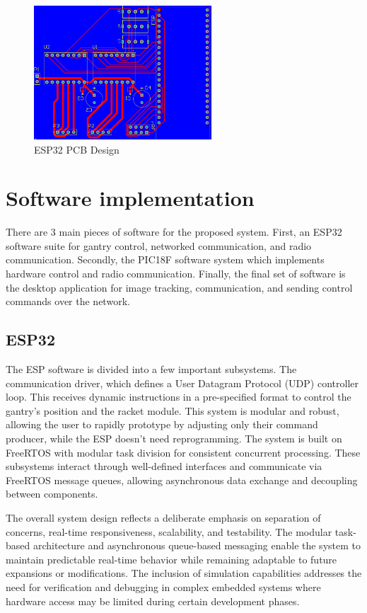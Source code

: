 \begin{figure}[h]
	\centering\includegraphics[height=5cm]{./images/ESP32_pcb}
	\caption{ESP32 PCB Design}
	\label{fig:esp-pcb}
\end{figure}


\section{Software implementation}

There are 3 main pieces of software for the proposed system. First, an ESP32 software suite for gantry control, networked communication, and radio communication. Secondly, the PIC18F software system which implements hardware control and radio communication. Finally, the final set of software is the desktop application for image tracking, communication, and sending control commands over the network.

\subsection{ESP32}
The ESP software is divided into a few important subsystems. The communication driver, which defines a User Datagram Protocol (UDP) controller loop. This receives dynamic instructions in a pre-specified format to control the gantry's position and the racket module. This system is modular and robust, allowing the user to rapidly prototype by adjusting only their command producer, while the ESP doesn't need reprogramming. The system is built on FreeRTOS with modular task division for consistent concurrent processing. These subsystems interact through well-defined interfaces and communicate via FreeRTOS message queues, allowing asynchronous data exchange and decoupling between components.

The overall system design reflects a deliberate emphasis on separation of concerns, real-time responsiveness, scalability, and testability. The modular task-based architecture and asynchronous queue-based messaging enable the system to maintain predictable real-time behavior while remaining adaptable to future expansions or modifications. The inclusion of simulation capabilities addresses the need for verification and debugging in complex embedded systems where hardware access may be limited during certain development phases.

